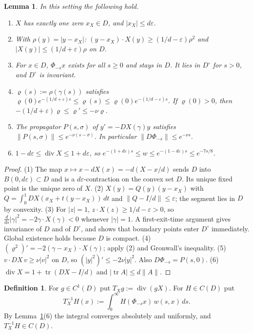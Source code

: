 \documentclass[11pt]{article}
\newtheorem{lemma}[theorem]{Lemma}
\theoremstyle{definition}
\newtheorem{definition}[theorem]{Definition}
\theoremstyle{remark}
\newcommand{\dv}{\operatorname{div}}
\newcommand{\Dint}{D^{\circ}}
\begin{document}
\begin{lemma}\label{lem:geom}
In this setting the following hold.
\begin{enumerate}[(1)]
\item $X$ has exactly one zero $x_X\in D$, and $|x_X|\le d\varepsilon$.
\item With $\rho(y)=|y-x_X|$: $(y-x_X)\cdot X(y)\ge(1/d-\varepsilon)\rho^2$ and $|X(y)|\le(1/d+\varepsilon)\rho$ on $D$.
\item For $x\in D$, $\Phi_{-s}x$ exists for all $s\ge0$ and stays in $D$. It lies in $\Dint$ for $s>0$, and $\Dint$ is invariant.
\item $\varrho(s):=\rho(\gamma(s))$ satisfies $\varrho(0)e^{-(1/d+\varepsilon)s}\le\varrho(s)\le\varrho(0)e^{-(1/d-\varepsilon)s}$. If $\varrho(0)>0$, then $-(1/d+\varepsilon)\varrho\le\varrho'\le-\nu\varrho$.
\item The propagator $P(s,\sigma)$ of $y'=-DX(\gamma)y$ satisfies $\|P(s,\sigma)\|\le e^{-\nu(s-\sigma)}$. In particular $\|D\Phi_{-s}\|\le e^{-\nu s}$.
\item $1-d\varepsilon\le\dv X\le1+d\varepsilon$, so $e^{-(1+d\varepsilon)s}\le w\le e^{-(1-d\varepsilon)s}\le e^{-7s/8}$.
\end{enumerate}
\end{lemma}

\begin{proof}
(1) The map $x\mapsto x-dX(x)=-d(X-x/d)$ sends $D$ into $B(0,d\varepsilon)\subset D$ and is a $d\varepsilon$-contraction on the convex set $D$. Its unique fixed point is the unique zero of $X$.
(2) $X(y)=Q(y)(y-x_X)$ with $Q=\int_0^1DX(x_X+t(y-x_X))\,dt$ and $\|Q-I/d\|\le\varepsilon$; the segment lies in $D$ by convexity.
(3) For $|z|=1$, $z\cdot X(z)\ge1/d-\varepsilon>0$, so $\frac{d}{ds}|\gamma|^2=-2\gamma\cdot X(\gamma)<0$ whenever $|\gamma|=1$. A first-exit-time argument gives invariance of $D$ and of $\Dint$, and shows that boundary points enter $\Dint$ immediately. Global existence holds because $D$ is compact.
(4) $(\varrho^2)'=-2(\gamma-x_X)\cdot X(\gamma)$; apply (2) and Gronwall's inequality.
(5) $v\cdot DX\,v\ge\nu|v|^2$ on $D$, so $(|y|^2)'\le-2\nu|y|^2$. Also $D\Phi_{-s}=P(s,0)$.
(6) $\dv X=1+\operatorname{tr}(DX-I/d)$ and $|\operatorname{tr}A|\le d\|A\|$.
\end{proof}

\begin{definition}\label{def:T}
For $g\in C^1(D)$ put $T_Xg:=\dv(gX)$. For $H\in C(D)$ put
\[
T_X^{-1}H(x):=\int_0^\infty H(\Phi_{-s}x)\,w(s,x)\,ds .
\]
By Lemma~\ref{lem:geom}(6) the integral converges absolutely and uniformly, and $T^{-1}_XH\in C(D)$.
\end{definition}
\end{document}
